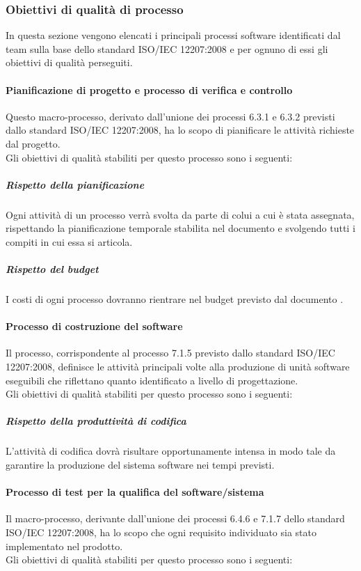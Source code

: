 		\subsubsection{Obiettivi di qualità di processo}
		In questa sezione vengono elencati i principali processi software identificati dal team sulla base dello standard ISO/IEC 12207:2008 e per ognuno di essi gli obiettivi di qualità perseguiti.
			\paragraph{Pianificazione di progetto e processo di verifica e controllo }
			Questo macro-processo, derivato dall'unione dei processi 6.3.1 e 6.3.2 previsti dallo standard ISO/IEC 12207:2008, ha lo scopo di pianificare le attività richieste dal progetto.
			\\Gli obiettivi di qualità stabiliti per questo processo sono i seguenti:

				\subparagraph{Rispetto della pianificazione}
				Ogni attività di un processo verrà svolta da parte di colui a cui è stata assegnata, rispettando la pianificazione temporale stabilita nel documento \PdP{} e svolgendo tutti i compiti in cui essa si articola.
				\subparagraph{Rispetto del budget}
				I costi di ogni processo dovranno rientrare nel budget previsto dal documento \PdP.
				
			\paragraph{Processo di costruzione del software}
			Il processo, corrispondente al processo 7.1.5 previsto dallo standard ISO/IEC 12207:2008, definisce le attività principali volte alla produzione di unità software eseguibili che riflettano quanto identificato a livello di progettazione.
			\\Gli obiettivi di qualità stabiliti per questo processo sono i seguenti:

				\subparagraph{Rispetto della produttività di codifica}
				L'attività di codifica dovrà risultare opportunamente intensa in modo tale da garantire la produzione del sistema software nei tempi previsti.
				
			\paragraph{Processo di test per la qualifica del software/sistema}
			Il macro-processo, derivante dall'unione dei processi 6.4.6 e 7.1.7 dello standard ISO/IEC 12207:2008, ha lo scopo che ogni requisito individuato sia stato implementato nel prodotto.
			\\Gli obiettivi di qualità stabiliti per questo processo sono i seguenti:

